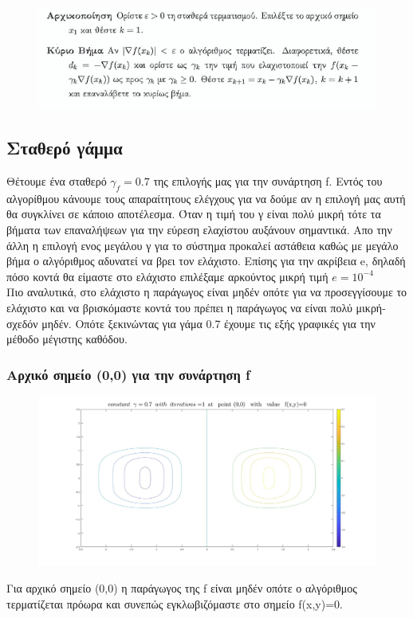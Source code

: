 \documentclass{article}
\begin{document}
\begin{figure}[h!]	
     \centering  
     \advance\leftskip-0.2cm  
  \includegraphics[width=130mm,scale=2]{desc0.png}
\end{figure} 
\clearpage
\subsection*{Σταθερό γάμμα}
Θέτουμε ένα σταθερό $\boxed{γ_f=0.7}$ της επιλογής μας για την συνάρτηση f. Εντός του αλγορίθμου κάνουμε τους απαραίτητους ελέγχους για να δούμε αν η επιλογή μας αυτή θα συγκλίνει σε κάποιο αποτέλεσμα. Όταν η τιμή του γ είναι πολύ μικρή τότε τα βήματα των επαναλήψεων για την εύρεση ελαχίστου αυξάνουν σημαντικά. Απο την άλλη η επιλογή ενος μεγάλου γ για το σύστημα προκαλεί αστάθεια καθώς με μεγάλο βήμα ο αλγόριθμος αδυνατεί να βρει τον ελάχιστο. Επίσης για την ακρίβεια e, δηλαδή πόσο κοντά θα είμαστε στο ελάχιστο επιλέξαμε αρκούντος μικρή τιμή $\boxed{e = 10^{-4}}$\\Πιο αναλυτικά, στο ελάχιστο η παράγωγος είναι μηδέν οπότε για να προσεγγίσουμε το ελάχιστο και να βρισκόμαστε κοντά του πρέπει η παράγωγος να είναι πολύ μικρή-σχεδόν μηδέν. 
Οπότε ξεκινώντας για γάμα 0.7 έχουμε τις εξής γραφικές για την μέθοδο μέγιστης καθόδου.
\clearpage
\subsubsection*{Αρχικό σημείο (0,0) για την συνάρτηση f}
\begin{figure}[h!]	
     \centering  
     \advance\leftskip-0.2cm  
  \includegraphics[width=140mm,scale=2]{t1a.jpg}
\end{figure} 
Για αρχικό σημείο (0,0) η παράγωγος της f είναι μηδέν οπότε ο αλγόριθμος τερματίζεται πρόωρα και συνεπώς εγκλωβιζόμαστε στο σημείο f(x,y)=0.
\end{document}
